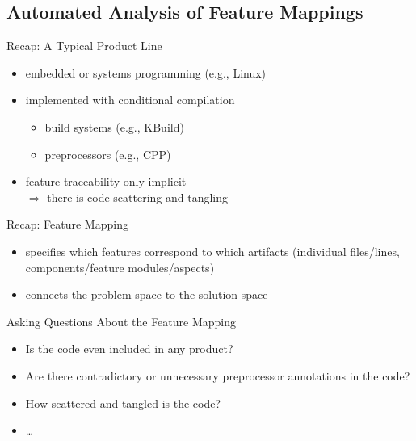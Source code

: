
\newcommand{\notleftright}{\mathrel{\ooalign{$\Leftrightarrow$\cr\hidewidth$/$\hidewidth}}}

\subsection{Automated Analysis of Feature Mappings}

\begin{frame}{\myframetitle}
	\begin{mycolumns}[widths={45,55}]
		\begin{note}{Recap: A Typical Product Line}
			\begin{itemize}
				\item embedded or systems programming (e.g., Linux)
				\item implemented with conditional compilation
				\begin{itemize}
					\item build systems (e.g., KBuild)
					\item preprocessors (e.g., CPP)
				\end{itemize}
				\item feature traceability only implicit\\
					$\Rightarrow$ there is code scattering and tangling
			\end{itemize}
		\end{note}
		\begin{definition}{Recap: Feature Mapping}
			\begin{itemize}
				\item specifies which features correspond to which artifacts (individual files/lines, components/feature modules/aspects)
				\item connects the problem space to the solution space
			\end{itemize}
		\end{definition}
		\mynextcolumn
		\begin{example}{Asking Questions About the Feature Mapping}
			\begin{itemize}
				\item Is the code even included in any product?
				\item Are there contradictory or unnecessary preprocessor annotations in the code?
				\item How scattered and tangled is the code?
				\item \ldots
			\end{itemize}
		\end{example}
	\end{mycolumns}
\end{frame}

